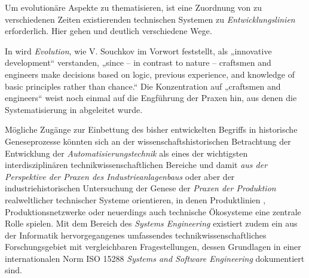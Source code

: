 \documentclass[12pt,a4paper]{article}
\begin{document}
Um evolutionäre Aspekte zu thematisieren, ist eine Zuordnung von zu
verschiedenen Zeiten existierenden technischen Systemen zu
\emph{Entwicklungslinien} erforderlich. Hier gehen \cite{Shpakovsky2010} und
\cite{TESE2018} deutlich verschiedene Wege.

In \cite{TESE2018} wird \emph{Evolution}, wie V. Souchkov im Vorwort
\cite[S. IX]{TESE2018} feststellt, als „innovative development“ verstanden,
„since -- in contrast to nature -- craftsmen and engineers make decisions
based on logic, previous experience, and knowledge of basic principles rather
than chance.“ Die Konzentration auf „craftsmen and engineers“ weist noch
einmal auf die Engführung der Praxen hin, aus denen die Systematisierung in
\cite{TESE2018} abgeleitet wurde.

Mögliche Zugänge zur Einbettung des bisher entwickelten Begriffs in
historische Geneseprozesse könnten sich an der wissenschaftshistorischen
Betrachtung \cite{Weller2008} der Entwicklung der
\emph{Automatisierungstechnik} als eines der wichtigsten interdisziplinären
technikwissenschaftlichen Bereiche und damit \emph{aus der Perspektive der
  Praxen des Industrieanlagenbaus} oder aber der industriehistorischen
Untersuchung der Genese der \emph{Praxen der Produktion} realweltlicher
technischer Systeme orientieren, in denen Produktlinien \cite{Pohl2005},
Produktionsnetzwerke \cite{Friedli2013} oder neuerdings auch technische
Ökosysteme \cite{Graebe2018} eine zentrale Rolle spielen. Mit dem Bereich des
\emph{Systems Engineering} existiert zudem ein aus der Informatik
hervorgegangenes umfassendes technikwissenschaftliches Forschungsgebiet mit
vergleichbaren Fragestellungen, dessen Grundlagen in einer internationalen
Norm ISO 15288 \emph{Systems and Software Engineering} dokumentiert sind.
\end{document}
